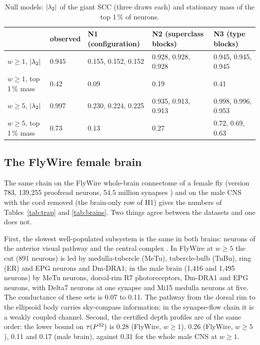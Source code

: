 \begin{table}[t]
\centering
\small
\caption{Null models: $\lvert\lambda_2\rvert$ of the giant SCC (three draws each) and stationary mass of the top
1\,\% of neurons.}
\label{tab:null}
\begin{tabular}{@{}lllll@{}}
\toprule
 & observed & N1 (configuration) & N2 (superclass blocks) & N3 (type blocks) \\
\midrule
$w\ge1$, $\lvert\lambda_2\rvert$ & 0.945 & 0.155, 0.152, 0.152 & 0.928, 0.928, 0.928 & 0.945, 0.945, 0.945 \\
$w\ge1$, top 1\,\% mass & 0.42 & 0.09 & 0.19 & 0.41 \\
$w\ge5$, $\lvert\lambda_2\rvert$ & 0.997 & 0.230, 0.224, 0.225 & 0.935, 0.913, 0.913 & 0.998, 0.996, 0.953 \\
$w\ge5$, top 1\,\% mass & 0.73 & 0.13 & 0.27 & 0.72, 0.69, 0.63 \\
\bottomrule
\end{tabular}
\end{table}

\subsection{The FlyWire female brain}\label{sec:flywire}

The same chain on the FlyWire whole-brain connectome of a female fly \cite{dorkenwald2024,schlegel2024}
(version 783, 139{,}255 proofread neurons, 54.5 million synapses \cite{flywire783}) and on the male
CNS with the cord removed (the brain-only row of H1) gives the numbers of Tables~\ref{tab:trap} and
\ref{tab:brains}. Two things agree between the datasets and one does not.

First, the slowest well-populated subsystem is the same in both brains: neurons of the anterior
visual pathway and the central complex \cite{hulse2021}. In FlyWire at $w\ge5$ the cut (891 neurons)
is led by medulla-tubercle (MeTu), tubercle-bulb (TuBu), ring (ER) and EPG neurons and Dm-DRA1; in
the male brain (1{,}416 and 1{,}495 neurons) by MeTu neurons, dorsal-rim R7 photoreceptors, Dm-DRA1
and EPG neurons, with Delta7 neurons at one synapse and Mi15 medulla neurons at five. The conductance of these sets is 0.07 to 0.11. The pathway from the dorsal
rim to the ellipsoid body carries sky-compass information; in the synapse-flow chain it is a weakly
coupled channel. Second, the certified depth profiles are of the same order: the lower bound
on $\tau(P^{32})$ is 0.28 (FlyWire, $w\ge1$), 0.26 (FlyWire, $w\ge5$), 0.11 and 0.17 (male brain),
against 0.31 for the whole male CNS at $w\ge1$.

